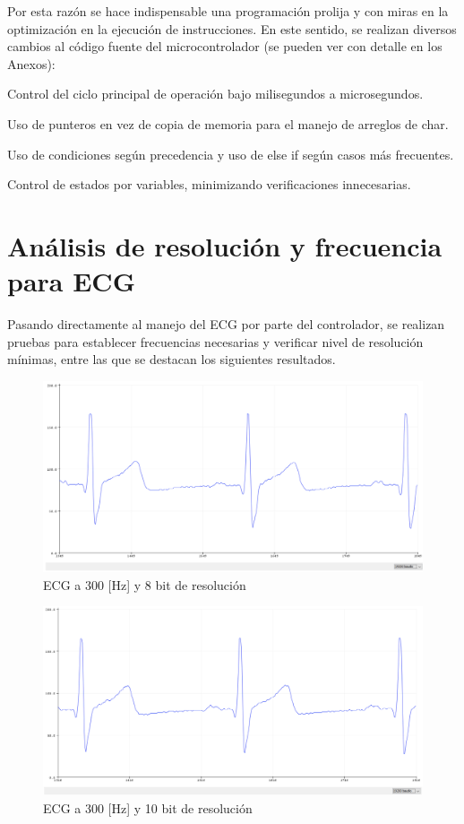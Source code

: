 Por esta razón se hace indispensable una programación prolija y con miras en la optimización en la ejecución de instrucciones. En este sentido, se realizan diversos cambios al código fuente del microcontrolador (se pueden ver con detalle en los Anexos):

Control del ciclo principal de operación bajo milisegundos a microsegundos.

Uso de punteros en vez de copia de memoria para el manejo de arreglos de char.

Uso de condiciones según precedencia y uso de else if según casos más frecuentes.

Control de estados por variables, minimizando verificaciones innecesarias.

\newpage

\section{Análisis de resolución y frecuencia para ECG}

Pasando directamente al manejo del ECG por parte del controlador, se realizan pruebas para establecer frecuencias necesarias y verificar nivel de resolución mínimas, entre las que se destacan los siguientes resultados.

\begin{figure}[H]
	\centering
	\includegraphics[scale=0.4]{figuras/proto2/8bit.png}
	\caption{ECG a 300 [Hz] y 8 bit de resolución}
	\label{8bit}
\end{figure}

\begin{figure}[H]
	\centering
	\includegraphics[scale=0.4]{figuras/proto2/10bit.png}
	\caption{ECG a 300 [Hz] y 10 bit de resolución}
	\label{10bit}
\end{figure}

